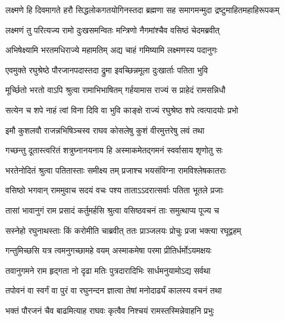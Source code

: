 \fourlineindentedshloka
{लक्ष्मणे हि दिवमागते हरौ}
{सिद्धलोकगतयोगिनस्तदा}
{ब्रह्मणा सह समागमन्मुदा}
{द्रष्टुमाहितमहाहिरूपकम्} %






\twolineshloka
{लक्ष्मणं तु परित्यज्य रामो दुःखसमन्वितः}
{मन्त्रिणो नैगमांश्चैव वसिष्ठं चेदमब्रवीत्} %

\twolineshloka
{अभिषेक्ष्यामि भरतमधिराज्ये महामतिम्}
{अद्य चाहं गमिष्यामि लक्ष्मणस्य पदानुगः} %

\twolineshloka
{एवमुक्ते रघुश्रेष्ठे पौरजानपदास्तदा}
{द्रुमा इवच्छिन्नमूला दुःखार्ताः पतिता भुवि} %

\twolineshloka
{मूर्च्छितो भरतो वाऽपि श्रुत्वा रामाभिभाषितम्}
{गर्हयामास राज्यं स प्राहेदं रामसन्निधौ} %

\twolineshloka
{सत्येन च शपे नाहं त्वां विना दिवि वा भुवि}
{काङ्क्षे राज्यं रघुश्रेष्ठ शपे त्वत्पादयोः प्रभो} %

\twolineshloka
{इमौ कुशलवौ राजन्नभिषिञ्चस्व राघव}
{कोसलेषु कुशं वीरमुत्तरेषु लवं तथा} %

\twolineshloka
{गच्छन्तु दूतास्त्वरितं शत्रुघ्नानयनाय हि}
{अस्माकमेतद्गमनं स्वर्वासाय शृणोतु सः} %

\twolineshloka
{भरतेनोदितं श्रुत्वा पतितास्ताः समीक्ष्य तम्}
{प्रजाश्च भयसंविग्ना रामविश्लेषकातराः} %

\twolineshloka
{वसिष्ठो भगवान् राममुवाच सदयं वचः}
{पश्य ताताऽऽदरात्सर्वाः पतिता भूतले प्रजाः} %

\twolineshloka
{तासां भावानुगं राम प्रसादं कर्तुमर्हसि}
{श्रुत्वा वसिष्ठवचनं ताः समुत्थाप्य पूज्य च} %

\twolineshloka
{सस्नेहो रघुनाथस्ताः किं करोमीति चाब्रवीत्}
{ततः प्राञ्जलयः प्रोचुः प्रजा भक्त्या रघूद्वहम्} %

\twolineshloka
{गन्तुमिच्छसि यत्र त्वमनुगच्छामहे वयम्}
{अस्माकमेषा परमा प्रीतिर्धर्मोऽयमक्षयः} %

\twolineshloka
{तवानुगमने राम हृद्गता नो दृढा मतिः}
{पुत्रदारादिभिः सार्धमनुयामोऽद्य सर्वथा} %

\twolineshloka
{तपोवनं वा स्वर्गं वा पुरं वा रघुनन्दन}
{ज्ञात्वा तेषां मनोदार्ढ्यं कालस्य वचनं तथा} %

\twolineshloka
{भक्तं पौरजनं चैव बाढमित्याह राघवः}
{कृत्वैव निश्चयं रामस्तस्मिन्नेवाहनि प्रभुः} %

